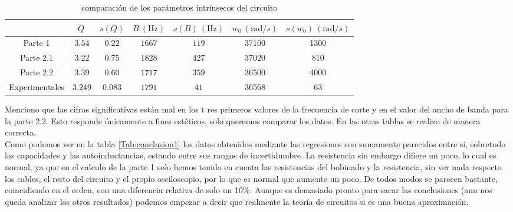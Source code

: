 \documentclass[12pt,a4paper]{article}
\newcommand{\Hz}{\mathrm{Hz} }
\begin{document}
\begin{table}[h!] 	 \centering 
\begin{tabular}{c|c|c|c|c|c|c|} 

  & \cellcolor{color3} $ Q \   $  & \cellcolor{color3}   $s(Q)  $  & \cellcolor{color3}  $ B \ (\Hz)  $ & \cellcolor{color3}  $s(B) \ (\Hz)$  & \cellcolor{color3} $ w_0 \ (\mathrm{rad}/s)$ &  \cellcolor{color3} $s(w_0) \ (\mathrm{rad}/s)$ \\ \hline 
  \cellcolor{color3} Parte 1 &  \cellcolor{color4} $ 3.54 $  & \cellcolor{color4} $0.22 $  & \cellcolor{color4} $1667  $  & \cellcolor{color4} $ 119 $ &  \cellcolor{color4} 37100 & \cellcolor{color4} 1300  \\ \hline 
 \cellcolor{color3} Parte 2.1 & \cellcolor{color4} $ 3.22 $  & \cellcolor{color4} $0.75 $  & \cellcolor{color4} $1828  $ & \cellcolor{color4}$ 427 $ & \cellcolor{color4} 37020 &  \cellcolor{color4} 810  \\ \hline 
 \cellcolor{color3} Parte 2.2 & \cellcolor{color4} $ 3.39 $  & \cellcolor{color4} $0.60 $  & \cellcolor{color4} $1717  $ & \cellcolor{color4}$ 359 $ & \cellcolor{color4} 36500 &\cellcolor{color4} 4000  \\ \hline  
 \cellcolor{color3} Experimentales & \cellcolor{color4} $ 3.249 $  & \cellcolor{color4} $0.083 $  & \cellcolor{color4} $ 1791  $ & \cellcolor{color4} $ 41 $ & \cellcolor{color4} 36568 & \cellcolor{color4} 63  \\  
\hline
\end{tabular} 
\caption{comparación de los parámetros intrínsecos del circuito} 
\label{Tab:conclusion2} 
\end{table} 
 
Menciono que las cifras significativas están mal en los t res primeros valores de la frecuencia de corte y en el valor del ancho de banda para la parte 2.2. Esto responde únicamente a fines estéticos, solo queremos comparar los datos. En las otras tablas se realizo de manera correcta. \\

 
Como podemos ver en la tabla \ref{Tab:conclusion1} los datos obtenidos mediante las regresiones son sumamente parecidos entre sí, sobretodo las capacidades y las autoinductancias, estando entre sus rangos de incertidumbre. La resistencia sin embargo difiere un poco, lo cual es normal, ya que en el calculo de la parte 1 solo hemos tenido en cuenta las resistencias del bobinado y la resistencia, sin ver nada respecto los cables, el resto del circuito y el propio osciloscopio, por lo que es normal que aumente un poco. De todos modos se parecen bastante, coincidiendo en el orden, con una diferencia relativa de solo un 10\%. Aunque es demasiado pronto para sacar las conclusiones (aun nos queda analizar los otros resultados) podemos empezar a decir que realmente la teoría de circuitos si es una buena aproximación. \\
\end{document}
